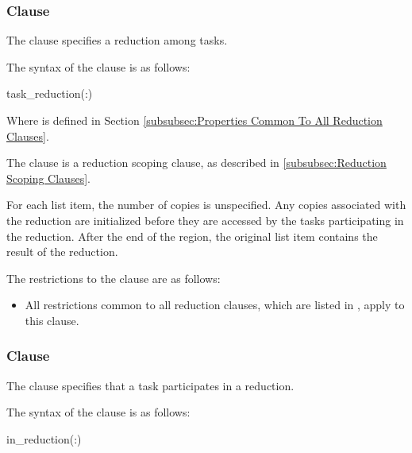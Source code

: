 \subsubsection{ Clause}
\label{subsubsec:task_reduction clause}
\summary
The  clause specifies a reduction among tasks.

\syntax
The syntax of the  clause is as follows:

\begin{ompSyntax}
task_reduction(:)
\end{ompSyntax}
Where  is defined in Section
\ref{subsubsec:Properties Common To All Reduction Clauses}.

\descr
The  clause is a reduction scoping clause, as described in
\ref{subsubsec:Reduction Scoping Clauses}.

For each list item, the number of copies is unspecified. Any copies associated
with the reduction are initialized before they are accessed by the tasks
participating in the reduction. After the end of the region, the original list
item contains the result of the reduction.

\restrictions
The restrictions to the  clause are as follows:

\begin{itemize}
\item All restrictions common to all reduction clauses, which are listed in
      , apply to
      this clause.
\end{itemize}



\subsubsection{ Clause}
\label{subsubsec:in_reduction clause}
\summary
The  clause specifies that a task participates in a reduction.

\syntax
The syntax of the  clause is as follows:

\begin{ompSyntax}
in_reduction(:)
\end{ompSyntax}

